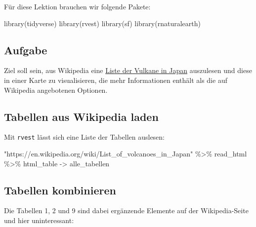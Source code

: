 \documentclass[
  ngerman,
]{article}
\newenvironment{Shaded}{\begin{snugshade}}{\end{snugshade}}
\newcommand{\FunctionTok}[1]{\textcolor[rgb]{0.00,0.00,0.00}{#1}}
\newcommand{\NormalTok}[1]{#1}
\newcommand{\OtherTok}[1]{\textcolor[rgb]{0.56,0.35,0.01}{#1}}
\newcommand{\SpecialCharTok}[1]{\textcolor[rgb]{0.00,0.00,0.00}{#1}}
\newcommand{\StringTok}[1]{\textcolor[rgb]{0.31,0.60,0.02}{#1}}
\begin{document}
Für diese Lektion brauchen wir folgende Pakete:

\begin{Shaded}
\begin{Highlighting}[]
\FunctionTok{library}\NormalTok{(tidyverse)}
\FunctionTok{library}\NormalTok{(rvest)}
\FunctionTok{library}\NormalTok{(sf)}
\FunctionTok{library}\NormalTok{(rnaturalearth)}
\end{Highlighting}
\end{Shaded}

\hypertarget{aufgabe}{%
\subsection{Aufgabe}\label{aufgabe}}

Ziel soll sein, aus Wikipedia eine \href{https://en.wikipedia.org/wiki/List_of_volcanoes_in_Japan}{Liste der Vulkane in Japan} auszulesen und diese in einer Karte zu visualisieren, die mehr Informationen enthält als die auf Wikipedia angebotenen Optionen.

\hypertarget{tabellen-aus-wikipedia-laden}{%
\subsection{Tabellen aus Wikipedia laden}\label{tabellen-aus-wikipedia-laden}}

Mit \texttt{rvest} lässt sich eine Liste der Tabellen auslesen:

\begin{Shaded}
\begin{Highlighting}[]
\StringTok{"https://en.wikipedia.org/wiki/List\_of\_volcanoes\_in\_Japan"} \SpecialCharTok{\%\textgreater{}\%}
\NormalTok{  read\_html }\SpecialCharTok{\%\textgreater{}\%}
\NormalTok{  html\_table }\OtherTok{{-}\textgreater{}}\NormalTok{ alle\_tabellen}
\end{Highlighting}
\end{Shaded}

\hypertarget{tabellen-kombinieren}{%
\subsection{Tabellen kombinieren}\label{tabellen-kombinieren}}

Die Tabellen 1, 2 und 9 sind dabei ergänzende Elemente auf der Wikipedia-Seite und hier uninteressant:
\end{document}
